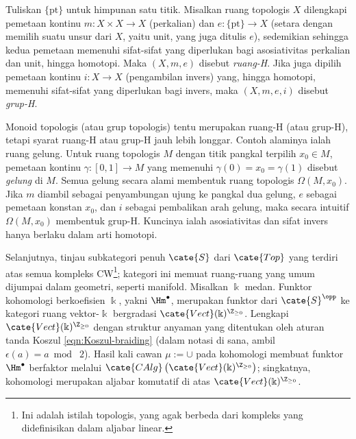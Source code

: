 \begin{example}[H.\ Hopf]
	Tuliskan $\{\mathrm{pt}\}$ untuk himpunan satu titik. Misalkan ruang
	topologis $X$ dilengkapi pemetaan kontinu
	$m:X\times X\to X$ (perkalian) dan
	$e:\{\mathrm{pt}\}\to X$ (setara dengan memilih suatu unsur dari $X$,
	yaitu unit, yang juga ditulis $e$), sedemikian sehingga kedua pemetaan
	memenuhi sifat-sifat yang diperlukan bagi asosiativitas perkalian dan unit,
	hingga homotopi. Maka $(X,m,e)$ disebut \emph{ruang-H}. Jika juga dipilih
	pemetaan kontinu $i:X\to X$ (pengambilan invers) yang, hingga homotopi,
	memenuhi sifat-sifat yang diperlukan bagi invers, maka $(X,m,e,i)$ disebut
	\emph{grup-H}.

	Monoid topologis (atau grup topologis) tentu merupakan ruang-H (atau
	grup-H), tetapi syarat ruang-H atau grup-H jauh lebih longgar. Contoh
	alaminya ialah ruang gelung. Untuk ruang topologis $M$ dengan titik pangkal
	terpilih $x_0\in M$, pemetaan kontinu $\gamma:[0,1]\to M$ yang memenuhi
	$\gamma(0)=x_0=\gamma(1)$ disebut \emph{gelung} di $M$. Semua gelung secara
	alami membentuk ruang topologis $\Omega(M,x_0)$. Jika $m$ diambil sebagai
	penyambungan ujung ke pangkal dua gelung, $e$ sebagai pemetaan konstan
	$x_0$, dan $i$ sebagai pembalikan arah gelung, maka secara intuitif
	$\Omega(M,x_0)$ membentuk grup-H. Kuncinya ialah asosiativitas dan sifat
	invers hanya berlaku dalam arti homotopi.

	Selanjutnya, tinjau subkategori penuh $\cate{S}$ dari $\cate{Top}$ yang
	terdiri atas semua kompleks CW\footnote{Ini adalah istilah topologis, yang
	agak berbeda dari kompleks yang didefinisikan dalam aljabar linear.};
	kategori ini memuat ruang-ruang yang umum dijumpai dalam geometri, seperti
	manifold. Misalkan $\Bbbk$ medan. Funktor kohomologi berkoefisien
	$\Bbbk$, yakni $\Hm^\bullet$, merupakan funktor dari $\cate{S}^{\opp}$ ke
	kategori ruang vektor-$\Bbbk$ bergradasi
	$\cate{Vect}(\Bbbk)^{\Z_{\geq0}}$. Lengkapi
	$\cate{Vect}(\Bbbk)^{\Z_{\geq0}}$ dengan struktur anyaman yang ditentukan
	oleh aturan tanda Koszul \eqref{eqn:Koszul-braiding} (dalam notasi di sana,
	ambil $\epsilon(a)=a\bmod\;2$). Hasil kali cawan
	$\mu:=\cup$ pada kohomologi membuat funktor $\Hm^\bullet$ berfaktor melalui
	$\cate{CAlg}\left(\cate{Vect}(\Bbbk)^{\Z_{\geq0}}\right)$; singkatnya,
	kohomologi merupakan aljabar komutatif di atas
	$\cate{Vect}(\Bbbk)^{\Z_{\geq0}}$.


\end{example}
